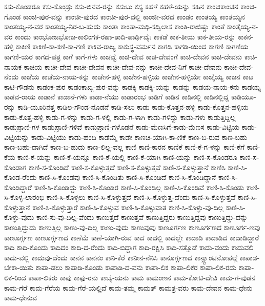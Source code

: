 ಕಸು-ಕೊಂಡರೂ
ಕಸು-ಕೊಂಡ್ರು
ಕಸು-ಬಿನವ-ರನ್ನು
ಕಸುಬು
ಕಸ್ಯ
ಕಹಳೆ
ಕಹಳೆ-ಯನ್ನು
ಕಹಿನ
ಕಾಂಚಿಕಾಂಚನ
ಕಾಂಚಿ-ಗೊಂಡ
ಕಾಂಚಿ-ಪುರ-ವನ್ನು
ಕಾಂಚೀ-ಪುರದ
ಕಾಂಚೀ-ಪುರ-ದಲ್ಲಿ
ಕಾಂಜೀ-ವರದ
ಕಾಂಡಂ
ಕಾಂತಯ್ಯ
ಕಾಂತಯ್ಯನ
ಕಾಂತಯ್ಯ-ನ-ವರ
ಕಾಂತಯ್ಯ-ನಿರ-ಬ-ಹುದು
ಕಾಂತಾ
ಕಾಂತಾ-ಮಧಿ-ಕದ್ವಿಲಾಸ
ಕಾಂತಿ-ರಾಜಿಷ್ಣು
ಕಾಂತೆ
ಕಾಂತೈಯ್ಯ-ನ-ವರ
ಕಾಂದು
ಕಾಂಭೋಜಭೋಜ-ಕಾಲಿಂಗಕ-ರಹಾ-ತಾದಿ-ಪಾರ್ಥಿವೈಃ
ಕಾಕಡೆ
ಕಾಕ-ತೀಯ
ಕಾಕ-ತೀಯ-ರನ್ನು
ಕಾಕನ-ಹಳ್ಳಿ
ಕಾಕಿಣಿ
ಕಾಕಿಣಿ-ಕಾ-ಕಣಿ-ಕಾ-ಗಣಿ
ಕಾಕಿವ-ರಾಜ್ಯ
ಕಾಕುಸ್ಥ-ವರ್ಮನ
ಕಾಗಡಿ
ಕಾಗಡಿ-ಯಿಂದ
ಕಾಗಣಿ
ಕಾಗಣಿಯ
ಕಾಗಣಿ-ಯರ
ಕಾಗದ-ಪತ್ರ
ಕಾಗೆ
ಕಾಗೆ-ಗಳು
ಕಾಚವ್ವೆ
ಕಾಚಿ-ದೇವ
ಕಾಚಿ-ದೇವಂಗೆ
ಕಾಚಿ-ದೇವನ
ಕಾಚಿ-ದೇವನು
ಕಾಚಿ-ನಾಯಕ
ಕಾಚಿಯ
ಕಾಚೀ-ದೇವ
ಕಾಚೀ-ದೇವನ
ಕಾಚೀ-ದೇವ-ನನ್ನು
ಕಾಚೀ-ದೇವ-ನಿಗೆ
ಕಾಚೀ-ದೇವನು
ಕಾಚೀ-ದೇವ-ನೆಂದು
ಕಾಚೆಯ
ಕಾಚೆಯ-ನಾಯ-ಕನ್ನು
ಕಾಚೇನ-ಹಳ್ಳಿ
ಕಾಚೇನ-ಹಳ್ಳಿಯ
ಕಾಚೇನ-ಹಳ್ಳಿಯೇ
ಕಾಚೈಯ್ಯ
ಕಾಜನ
ಕಾಟ
ಕಾಟಿ-ಗೌಡನು
ಕಾಡಂಕ-ಪುರ
ಕಾಡಂಕಾಖ್ಯ-ಪುರ-ವನ್ನು
ಕಾಡಕ್ಕಿ
ಕಾಡಕ್ಕಿ-ಯನ್ನು
ಕಾಡನ್ನು
ಕಾಡಯ-ನಾಯ-ಕನು
ಕಾಡಯ್ಯ
ಕಾಡವ-ರಾಯ
ಕಾಡಾನೆ
ಕಾಡಾನೆ-ಗಳು
ಕಾಡಾ-ನೆಯು
ಕಾಡಾರಂಭ
ಕಾಡಿಗೆ
ಕಾಡಿನ
ಕಾಡಿನಲ್ಲಿ
ಕಾಡಿನಲ್ಲಿದ್ದ
ಕಾಡಿಯೂ-ರನ್ನು
ಕಾಡಿ-ಯೂರಿನತ್ತ
ಕಾಡಿಲ-ಗೌಂಡ-ನೊಡನೆ
ಕಾಡಿ-ಸಲು
ಕಾಡು
ಕಾಡು-ಕೊತ್ತನ-ಹಳ್ಳಿ
ಕಾಡು-ಕೊತ್ತನ-ಹಳ್ಳಿಯ
ಕಾಡು-ಕೊತ್ತ-ಹಳ್ಳಿ
ಕಾಡು-ಗ-ಳನ್ನು
ಕಾಡು-ಗ-ಳಲ್ಲಿ
ಕಾಡು-ಗ-ಳಾಗಿ
ಕಾಡು-ಗಳಿದ್ದು
ಕಾಡು-ಗಳು
ಕಾಡುತ್ತಿದ್ದಿಲ್ಲ
ಕಾಡುಪ್ರಾಣಿ-ಗಳ
ಕಾಡುಪ್ರಾಣಿ-ಗಳಿವೆ
ಕಾಡುಪ್ರಾಣಿ-ಗಳೊಡನೆ
ಕಾಡು-ಮೆಣಸಿಗೆ-ಕಾಡು-ಮೆಣಸ
ಕಾಡು-ವಿಟ್ಟಿಯ
ಕಾಡು-ವಿಟ್ಟಿಯನ್ನು
ಕಾಡು-ವಿಟ್ಟಿಯು
ಕಾಡು-ಹಂದಿ
ಕಾಡೆಮ್ಮೆ
ಕಾಡೇ
ಕಾಣಚಿ-ಯಾಗಿ-ಕಾ-ಣಿಕೆ
ಕಾಣ-ಬ-ರುವ
ಕಾಣ-ಬಹು
ಕಾಣ-ಬಹು-ದಾಗಿದೆ
ಕಾಣ-ಬ-ಹುದು
ಕಾಣ-ಲಿಲ್ಲ-ವಲ್ಲ
ಕಾಣಿ
ಕಾಣಿ-ಕಾರನ
ಕಾಣಿಕೆ
ಕಾಣಿ-ಕೆ-ಗ-ಳನ್ನು
ಕಾಣಿ-ಕೆಗೆ
ಕಾಣಿ-ಕೆಯ
ಕಾಣಿ-ಕೆ-ಯನ್ನು
ಕಾಣಿ-ಕೆ-ಯನ್ನೂ
ಕಾಣಿ-ಕೆ-ಯಲ್ಲಿ
ಕಾಣಿ-ಕೆ-ಯಾಗಿ
ಕಾಣಿ-ಯನ್ನು
ಕಾಣಿ-ಸ-ಕೊಂಡರೂ
ಕಾಣಿ-ಸ-ಕೊಂಡಾಗ
ಕಾಣಿ-ಸ-ಕೊಂಡಿದೆ
ಕಾಣಿ-ಸ-ಕೊಳ್ಳುತ್ತದೆ
ಕಾಣಿ-ಸ-ಕೊಳ್ಳುತ್ತವೆ
ಕಾಣಿ-ಸ-ಕೊಳ್ಳುತ್ತಾನೆ
ಕಾಣಿಸಿ
ಕಾಣಿ-ಸಿ-ಕೊಂಡ-ರೆಂದು
ಕಾಣಿ-ಸಿ-ಕೊಂಡವು
ಕಾಣಿ-ಸಿ-ಕೊಂಡಿತು
ಕಾಣಿ-ಸಿ-ಕೊಂಡಿದೆ
ಕಾಣಿ-ಸಿ-ಕೊಂಡಿದ್ದಾನೆ
ಕಾಣಿ-ಸಿ-ಕೊಂಡಿದ್ದಾರೆ
ಕಾಣಿ-ಸಿ-ಕೊಂಡಿದ್ದು
ಕಾಣಿ-ಸಿ-ಕೊಂಡಿರ
ಕಾಣಿ-ಸಿ-ಕೊಂಡಿಲ್ಲ
ಕಾಣಿ-ಸಿ-ಕೊಂಡಿವೆ
ಕಾಣಿ-ಸಿ-ಕೊಂಡು
ಕಾಣಿ-ಸಿ-ಕೊಳ್ಳ-ಲಾರಂಭಿ
ಕಾಣಿ-ಸಿ-ಕೊಳ್ಳಲು
ಕಾಣಿ-ಸಿ-ಕೊಳ್ಳುತ್ತದೆ
ಕಾಣಿ-ಸಿ-ಕೊಳ್ಳುತ್ತ-ದೆಂದು
ಕಾಣಿ-ಸಿ-ಕೊಳ್ಳುತ್ತವೆ
ಕಾಣಿ-ಸಿ-ಕೊಳ್ಳುತ್ತಾನೆ
ಕಾಣಿ-ಸಿ-ಕೊಳ್ಳುತ್ತಾರೆ
ಕಾಣಿ-ಸಿ-ಕೊಳ್ಳುವ
ಕಾಣಿ-ಸಿ-ಕೊಳ್ಳುವಾತ
ಕಾಣಿ-ಸಿ-ಕೊಳ್ಳು-ವು-ದಿಲ್ಲ
ಕಾಣಿ-ಸಿ-ಕೊಳ್ಳು-ವುದು
ಕಾಣಿ-ಸು-ವು-ದಿಲ್ಲ-ವೆಂದು
ಕಾಣುತ್ತದೆ
ಕಾಣುತ್ತವೆ
ಕಾಣುತ್ತಿದ್ದರು
ಕಾಣುತ್ತಿದ್ದವು
ಕಾಣುತ್ತಿದ್ದು-ದನ್ನು
ಕಾಣುತ್ತಿದ್ದುದು
ಕಾಣುತ್ತಿಲ್ಲ
ಕಾಣು-ವು-ದಿಲ್ಲ
ಕಾಣು-ವುದು
ಕಾಣುವುವು
ಕಾಣೂರ್ಗಣ
ಕಾಣೂರ್ಗಣದ
ಕಾಣೂರ್ಗ-ಣವು
ಕಾಣೂರ್ಗ್ಗಣ
ಕಾಣೂರ್ಗ್ಗಣದ
ಕಾಣೆಮೆ
ಕಾಣೆ-ಯಾಗಿ-ರುವ
ಕಾದ
ಕಾದಲ್ಲಿ
ಕಾದಲ್ಲೇ
ಕಾದಾಡಿ
ಕಾದಾಡಿದ
ಕಾದಾಡಿದ್ದಾರೆ
ಕಾದಿ
ಕಾದಿ-ಕೊಂದು
ಕಾದಿದಂ
ಕಾದಿ-ದ-ರೆಂದು
ಕಾದಿ-ಬಿದ್ದಾಗ
ಕಾದಿ-ರಕ್ಷಿಸಿ
ಕಾದಿ-ಸತ್ತೊಡೆ
ಕಾದು-ವಂದು
ಕಾದುವಲಿ
ಕಾದು-ವಲ್ಲಿ
ಕಾದುವು-ದೆಂದು
ಕಾನನ
ಕಾನನಂ
ಕಾನಿ-ಕೆರೆ
ಕಾನೀನ-ನೆನಿಸಿ
ಕಾನೂರ್ಗ್ಗಣದ
ಕಾನ್ಸ್ಟಾಂಟಿನೋಪಲ್ಗೆ
ಕಾಪಾಡ-ಬೇಕಾ-ಯಿತು
ಕಾಪಾ-ಡಲು
ಕಾಪಾಡಿ-ಕೊಂಡು
ಕಾಪಾಡಿ-ದ-ವನು
ಕಾಪಾ-ಲಿಕ
ಕಾಪಾ-ಲಿಕರ
ಕಾಪಾ-ಲಿಕ-ರದು
ಕಾಪಾ-ಲಿಕ-ರಿಂದ
ಕಾಪಾ-ಲಿಕರು
ಕಾಪು
ಕಾಫು-ರನು
ಕಾಬೈ-ಯನು
ಕಾಮ
ಕಾಮಂಣನ
ಕಾಮ-ಕೋಟಿ-ದೇವಿ
ಕಾಮ-ಗ-ವುಡನ
ಕಾಮ-ಗೆರೆ
ಕಾಮ-ಗೆರೆಯ
ಕಾಮ-ಗೆರೆ-ಯಲ್ಲಿದೆ
ಕಾಮ-ತಮ್ಮ
ಕಾಮತ್
ಕಾಮತ್ರ-ವರು
ಕಾಮ-ದೇವನ
ಕಾಮ-ಧೇನು
ಕಾಮ-ಧೇನುವ
